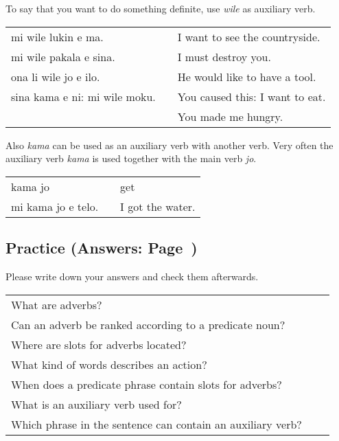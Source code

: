 To say that you want to do something definite, use \textit{wile} as auxiliary verb. 

\begin{supertabular}{p{5,5cm}|ll}
mi wile lukin e ma. && I want to see the countryside. \\
mi wile pakala e sina. && I must destroy you. \\
ona li wile jo e ilo. && He would like to have a tool. \\
sina kama e ni: mi wile moku. && You caused this: I want to eat. \\ && You made me hungry. \\
\end{supertabular} 

Also \textit{kama} can be used as an auxiliary verb with another verb.
Very often the auxiliary verb \textit{kama} is used together with the main verb \textit{jo}.  

\begin{supertabular}{p{5,5cm}|ll}
kama jo && get \\
mi kama jo e telo. && I got the water. \\
\end{supertabular} 

%
\newpage
\subsection*{Practice (Answers: Page~\pageref{'adverbs'})}

Please write down your answers and check them afterwards. 

\begin{supertabular}{p{5,5cm}|ll}
What are adverbs? &&  \\ %
Can an adverb be ranked according to a predicate noun? &&   \\ %
Where are slots for adverbs located? &&  \\ %
What kind of words describes an action? &&  \\ %
When does a predicate phrase contain slots for adverbs? &&  \\ %
What is an auxiliary verb used for?  &&   \\ %
Which phrase in the sentence can contain an auxiliary verb? &&   \\ %
\end{supertabular}

